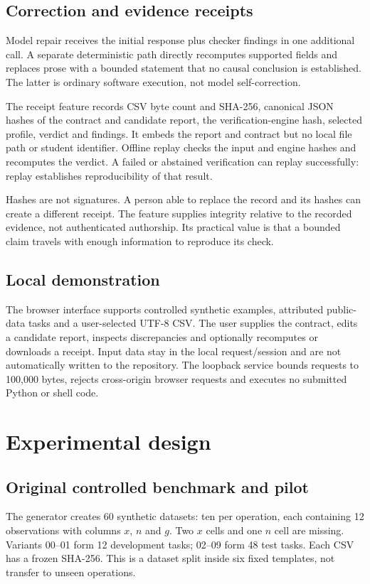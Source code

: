 \subsection{Correction and evidence receipts}
Model repair receives the initial response plus checker findings in one additional call. A separate deterministic path directly recomputes supported fields and replaces prose with a bounded statement that no causal conclusion is established. The latter is ordinary software execution, not model self-correction.

The receipt feature records CSV byte count and SHA-256, canonical JSON hashes of the contract and candidate report, the verification-engine hash, selected profile, verdict and findings. It embeds the report and contract but no local file path or student identifier. Offline replay checks the input and engine hashes and recomputes the verdict. A failed or abstained verification can replay successfully: replay establishes reproducibility of that result.

Hashes are not signatures. A person able to replace the record and its hashes can create a different receipt. The feature supplies integrity relative to the recorded evidence, not authenticated authorship. Its practical value is that a bounded claim travels with enough information to reproduce its check.

\subsection{Local demonstration}
The browser interface supports controlled synthetic examples, attributed public-data tasks and a user-selected UTF-8 CSV. The user supplies the contract, edits a candidate report, inspects discrepancies and optionally recomputes or downloads a receipt. Input data stay in the local request/session and are not automatically written to the repository. The loopback service bounds requests to 100,000 bytes, rejects cross-origin browser requests and executes no submitted Python or shell code.

\section{Experimental design}
\subsection{Original controlled benchmark and pilot}
The generator creates 60 synthetic datasets: ten per operation, each containing 12 observations with columns $x$, $n$ and $g$. Two $x$ cells and one $n$ cell are missing. Variants 00--01 form 12 development tasks; 02--09 form 48 test tasks. Each CSV has a frozen SHA-256. This is a dataset split inside six fixed templates, not transfer to unseen operations.

